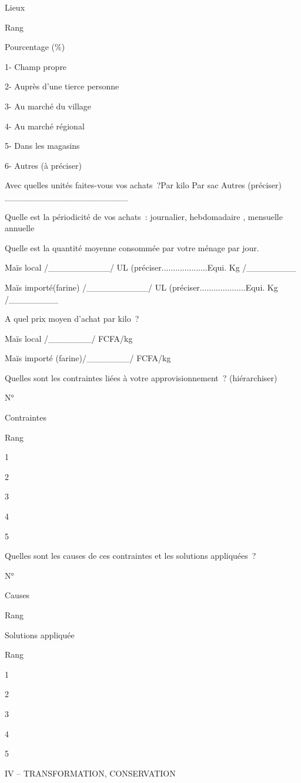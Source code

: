 \documentclass[12pt,oneside]{report}
\begin{document}
Lieux

Rang

Pourcentage (\%)

1- Champ propre

2- Auprès d’une tierce personne

3- Au marché du village

4- Au marché régional

5- Dans les magasins

6- Autres (à préciser)

Avec quelles unités faites-vous vos achats ?Par kilo   Par sac         Autres (préciser) \_\_\_\_\_\_\_\_\_\_\_\_\_\_\_\_\_\_\_\_

Quelle est la périodicité de vos achats : journalier,      hebdomadaire ,       mensuelle          annuelle

Quelle est la quantité moyenne consommée par votre ménage par jour.

Maïs local    /\_\_\_\_\_\_\_\_\_\_/ UL (préciser....................Equi. Kg /\_\_\_\_\_\_\_\_

Maïs importé(farine) /\_\_\_\_\_\_\_\_\_\_/ UL (préciser....................Equi. Kg /\_\_\_\_\_\_\_\_

A quel prix moyen d’achat par kilo ?

Maïs local    /\_\_\_\_\_\_\_/  FCFA/kg

Maïs importé (farine)/\_\_\_\_\_\_\_/  FCFA/kg

Quelles sont les contraintes liées à votre approvisionnement ? (hiérarchiser)

N°

Contraintes

Rang

1

2

3

4

5

Quelles sont les causes de ces contraintes et les solutions appliquées ?

N°

Causes

Rang

Solutions appliquée

Rang

1

2

3

4

5

IV – TRANSFORMATION, CONSERVATION
\end{document}
